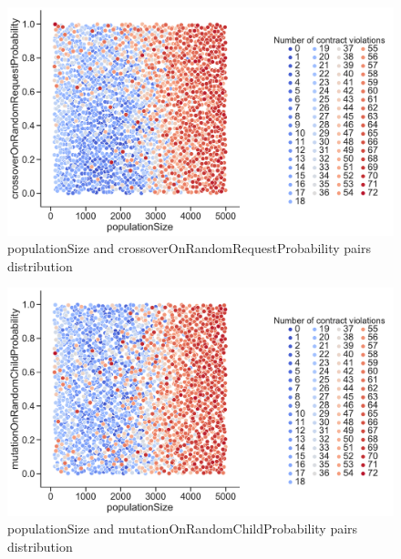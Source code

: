 \begin{figure}
	\centering
	\includegraphics[width=\textwidth]{images/PairsDistr/populationSize_crossoverOnRandomRequestProbability.pdf}
	\caption[populationSize and crossoverOnRandomRequestProbability pairs distribution]{populationSize and crossoverOnRandomRequestProbability pairs distribution}
	\label{fig:populationSize_crossoverOnRandomRequestProbability_pair}
\end{figure}
\begin{figure}
	\centering
	\includegraphics[width=\textwidth]{images/PairsDistr/populationSize_mutationOnRandomChildProbability.pdf}
	\caption[populationSize and mutationOnRandomChildProbability pairs distribution]{populationSize and mutationOnRandomChildProbability pairs distribution}
	\label{fig:populationSize_mutationOnRandomChildProbability_pair}
\end{figure}
